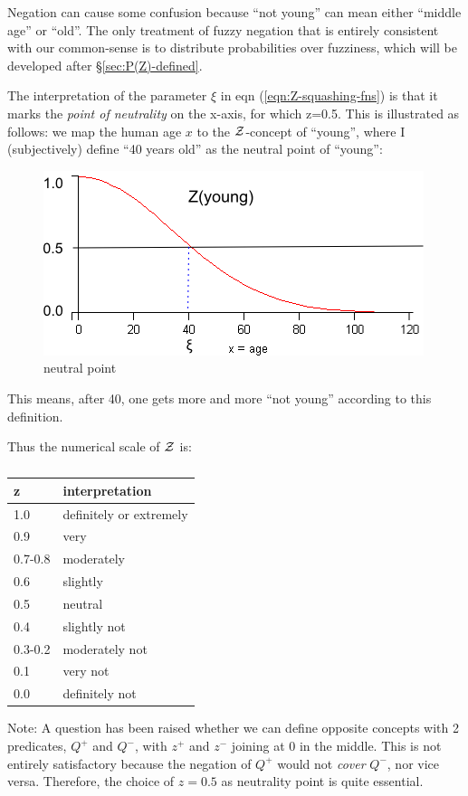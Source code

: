 Negation can cause some confusion because ``not young'' can mean either ``middle age'' or ``old''.  The only treatment of fuzzy negation that is entirely consistent with our common-sense is to distribute probabilities over fuzziness,  which will be developed after \S\ref{sec:P(Z)-defined}.

The interpretation of the parameter $\xi$ in eqn (\ref{eqn:Z-squashing-fns}) is that it marks the \textit{point of neutrality} on the x-axis, for which z=0.5.  This is illustrated as follows:  we map the human age $x$ to the $\mathcal{Z}$-concept of ``young'', where I (subjectively) define ``40 years old'' as the neutral point of ``young'':
\begin{figure}[H]
\centering
\includegraphics{neutral-point.png}
\caption{neutral point}
\end{figure}
This means, after 40, one gets more and more ``not young'' according to this definition.  

Thus the numerical scale of $\mathcal{Z}$ is:\\
\begin{table}[H]
\parbox{3cm}{\caption{}}
\begin{tabular}{|l||l|}
\hline
{\bfseries z} & {\bfseries interpretation}\\ \hline
1.0     & definitely or extremely\\
0.9     & very\\
0.7-0.8 & moderately\\
0.6     & slightly\\ \hline
0.5     & neutral\\ \hline
0.4     & slightly not\\
0.3-0.2 & moderately not\\
0.1     & very not\\
0.0     & definitely not\\ \hline
\end{tabular}
\end{table}

Note:  A question has been raised whether we can define opposite concepts with 2 predicates, $Q^+$ and $Q^-$, with $z^+$ and $z^-$ joining at 0 in the middle.  This is not entirely satisfactory because the negation of $Q^+$ would not \textit{cover} $Q^-$, nor vice versa.  Therefore, the choice of $z=0.5$ as neutrality point is quite essential.

